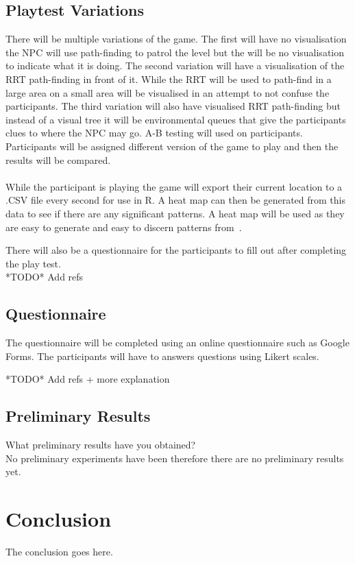 \documentclass[journal]{IEEEtran}
\begin{document}
\subsection{Playtest Variations}
There will be multiple variations of the game. The first will have no visualisation the NPC will use path-finding to patrol the level but the will be no visualisation to indicate what it is doing.  The second variation will have a visualisation of the RRT path-finding in front of it. While the RRT will be used to path-find in a large area on a small area will be visualised in an attempt to not confuse the participants. The third variation will also have visualised RRT path-finding but instead of a visual tree it will be environmental queues that give the participants clues to where the NPC may go. A-B testing will used on participants. Participants will be assigned different version of the game to play and then the results will be compared. \\
\\
While the participant is playing the game will export their current location to a .CSV file every second for use in R. A heat map can then be generated from this data to see if there are any significant patterns. A heat map will be used as they are easy to generate and easy to discern patterns from~\cite{Wallner2015}.

There will also be a questionnaire for the participants to fill out after completing the play test.\\

*TODO* Add refs

\subsection{Questionnaire}
The questionnaire will be completed using an online questionnaire such as Google Forms. The participants will have to answers questions using Likert scales.

*TODO* Add refs + more explanation




\subsection{Preliminary Results}
What preliminary results have you obtained? \\
No preliminary experiments have been therefore there are no preliminary results yet.


\section{Conclusion}
The conclusion goes here.







\end{document}
